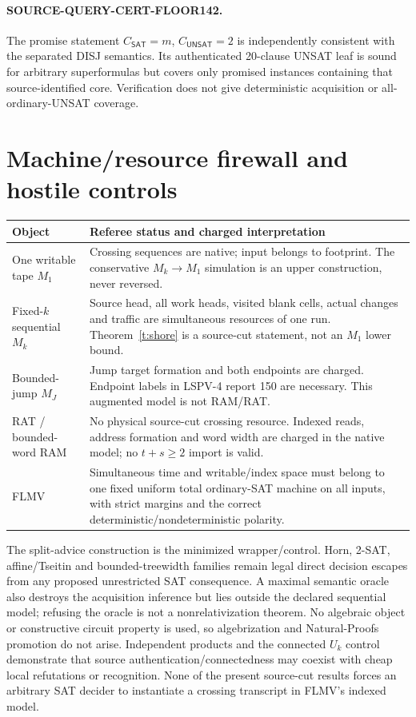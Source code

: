 \documentclass[11pt]{article}
\newcommand{\SAT}{\mathsf{SAT}}
\newcommand{\UNSAT}{\mathsf{UNSAT}}
\begin{document}
\paragraph{SOURCE-QUERY-CERT-FLOOR142.}
The promise statement $C_{\SAT}=m$, $C_{\UNSAT}=2$ is independently
consistent with the separated DISJ semantics.  Its authenticated 20-clause
UNSAT leaf is sound for arbitrary superformulas but covers only promised
instances containing that source-identified core.  Verification does not
give deterministic acquisition or all-ordinary-UNSAT coverage.

\section{Machine/resource firewall and hostile controls}
\begin{center}\small
\begin{tabularx}{.97\linewidth}{p{.18\linewidth}X}
\toprule
Object & Referee status and charged interpretation\\\midrule
One writable tape $M_1$ & Crossing sequences are native; input belongs to
footprint.  The conservative $M_k\to M_1$ simulation is an upper
construction, never reversed.\\
Fixed-$k$ sequential $M_k$ & Source head, all work heads, visited blank
cells, actual changes and traffic are simultaneous resources of one run.
Theorem~\ref{t:shore} is a source-cut statement, not an $M_1$ lower bound.\\
Bounded-jump $M_J$ & Jump target formation and both endpoints are charged.
Endpoint labels in LSPV-4 report 150 are necessary.  This augmented model is
not RAM/RAT.\\
RAT / bounded-word RAM & No physical source-cut crossing resource.
Indexed reads, address formation and word width are charged in the native
model; no $t+s\ge2$ import is valid.\\
FLMV & Simultaneous time and writable/index space must belong to one fixed
uniform total ordinary-SAT machine on all inputs, with strict margins and
the correct deterministic/nondeterministic polarity.\\
\bottomrule
\end{tabularx}
\end{center}

The split-advice construction is the minimized wrapper/control.  Horn,
2-SAT, affine/Tseitin and bounded-treewidth families remain legal direct
decision escapes from any proposed unrestricted SAT consequence.  A
maximal semantic oracle also destroys the acquisition inference but lies
outside the declared sequential model; refusing the oracle is not a
nonrelativization theorem.  No algebraic object or constructive circuit
property is used, so algebrization and Natural-Proofs promotion do not
arise.  Independent products and the connected $U_k$ control demonstrate
that source authentication/connectedness may coexist with cheap local
refutations or recognition.  None of the present source-cut results forces
an arbitrary SAT decider to instantiate a crossing transcript in FLMV's
indexed model.
\end{document}
